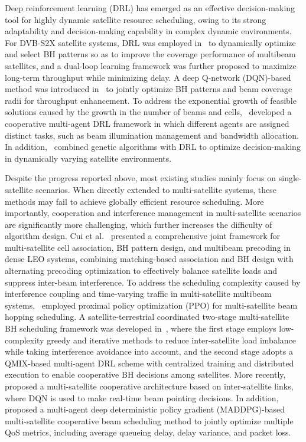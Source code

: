 \documentclass[journal]{IEEEtran}
\begin{document}
Deep reinforcement learning (DRL) has emerged as an effective decision-making tool for highly dynamic satellite resource scheduling, owing to its strong adaptability and decision-making capability in complex dynamic environments. For DVB-S2X satellite systems, DRL was employed in~\cite{ref16} to dynamically optimize and select BH patterns so as to improve the coverage performance of multibeam satellites, and a dual-loop learning framework was further proposed to maximize long-term throughput while minimizing delay. A deep Q-network (DQN)-based method was introduced in~\cite{ref17} to jointly optimize BH patterns and beam coverage radii for throughput enhancement. To address the exponential growth of feasible solutions caused by the growth in the number of beams and cells,~\cite{ref18} developed a cooperative multi-agent DRL framework in which different agents are assigned distinct tasks, such as beam illumination management and bandwidth allocation. In addition,~\cite{ref19} combined genetic algorithms with DRL to optimize decision-making in dynamically varying satellite environments.

Despite the progress reported above, most existing studies mainly focus on single-satellite scenarios. When directly extended to multi-satellite systems, these methods may fail to achieve globally efficient resource scheduling. More importantly, cooperation and interference management in multi-satellite scenarios are significantly more challenging, which further increases the difficulty of algorithm design. Cui et al.~\cite{refCuiPrecoding2025} presented a comprehensive joint framework for multi-satellite cell association, BH pattern design, and multibeam precoding in dense LEO systems, combining matching-based association and BH design with alternating precoding optimization to effectively balance satellite loads and suppress inter-beam interference. To address the scheduling complexity caused by interference coupling and time-varying traffic in multi-satellite multibeam systems,~\cite{ref20} employed proximal policy optimization (PPO) for multi-satellite beam hopping scheduling. A satellite-terrestrial coordinated two-stage multi-satellite BH scheduling framework was developed in~\cite{ref21}, where the first stage employs low-complexity greedy and iterative methods to reduce inter-satellite load imbalance while taking interference avoidance into account, and the second stage adopts a QMIX-based multi-agent DRL scheme with centralized training and distributed execution to enable cooperative BH decisions among satellites. More recently,~\cite{ref22} proposed a multi-satellite cooperative architecture based on inter-satellite links, where DQN is used to make real-time beam pointing decisions. In addition,~\cite{ref23} proposed a multi-agent deep deterministic policy gradient (MADDPG)-based multi-satellite cooperative beam scheduling method to jointly optimize multiple QoS metrics, including average queueing delay, delay variance, and packet loss.
\end{document}
